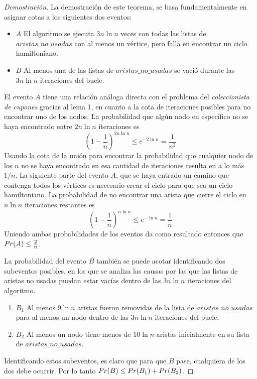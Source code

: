 \documentclass[12pt,letterpaper]{article}
\begin{document}
  \begin{proof}[Demostración]
  La demostración de este teorema, se basa fundamentalmente en asignar cotas a los siguientes dos eventos:
  \begin{itemize}
  	\item $A$ El algoritmo se ejecuta $3n\ln n$ veces con todas las listas de $aristas\_no\_usadas$ con al menos un vértice, pero falla en encontrar un ciclo hamiltoniano.
  	\item $B$ Al menos una de las listas de $aristas\_no\_usadas$ se vació durante las $3n \ln n$ iteraciones del bucle.  
  \end{itemize}
  El evento $A$ tiene una relación análoga directa con el problema del \textit{coleccionista de cupones} gracias al lema 1, en cuanto a la cota de iteraciones posibles para no encontrar uno de los nodos. La probabilidad que algún nodo en especifico no se haya encontrado entre $2n\ln n$ iteraciones es
  \begin{equation*}
  \left(1 - \frac{1}{n}\right)^{2n\ln n} \leq e^{-2\ln n} = \frac{1}{n^2}
  \end{equation*}
  Usando la cota de la unión para encontrar la probabilidad que cualquier nodo de los $n$ no se haya encontrado en esa cantidad de iteraciones resulta en a lo más $1/n$.
  La siguiente parte del evento $A$, que se haya entrado un camino que contenga todos los vértices es necesario crear el ciclo para que sea un ciclo hamiltoniano. La probabilidad de no encontrar una arista que cierre el ciclo en $n\ln n$ iteraciones restantes es
  \begin{equation*}
  \left(1-\frac{1}{n}\right)^{n\ln n} \leq e^{-\ln n} = \frac{1}{n}
  \end{equation*} 
  Uniendo ambas probabilidades de los eventos da como resultado entonces que $\mathnormal{Pr}(A)\leq \frac{2}{n}$.
  
  La probabilidad del evento $B$ también se puede acotar identificando dos subeventos posibles, en los que se analiza las causas por las que las listas de aristas no usadas puedan estar vacías dentro de las $3n\ln n$ iteraciones del algoritmo.
  \begin{enumerate}
  	\item $B_1$ Al menos $9\ln n$ aristas fueron removidas de la lista de $aristas\_no\_usadas$ para al menos un nodo dentro de las $3n\ln n $ iteraciones del bucle.
  	\item $B_2$ Al menos un nodo tiene menos de $10 \ln n$ aristas inicialmente en su lista de $aristas\_no\_usadas$. 
  \end{enumerate}
Identificando estos subeventos, es claro que para que $B$ pase, cualquiera de los dos debe ocurrir. Por lo tanto $\mathnormal{Pr}(B) \leq \mathnormal{Pr}(B_1)+\mathnormal{Pr}(B_2)$.


\end{proof}
\end{document}
